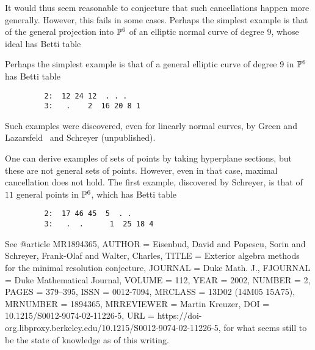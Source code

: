 It would thus seem reasonable to conjecture that such cancellations happen more generally. However, this fails in some cases. Perhaps the simplest example is that of the general projection into ${\mathbb P}^{6}$ of
an elliptic normal curve of degree 9, whose ideal has Betti table

Perhaps the simplest example is that of a general elliptic curve of degree 9 in ${\mathbb P}^{6}$
has Betti table
\begin{verbatim}
         2:  12 24 12  . . .
         3:   .    2  16 20 8 1
\end{verbatim}
Such examples were discovered, even for linearly normal curves, by Green and Lazarsfeld~\cite{ M. GREEN and R. LAZARSFELD, Some results on the syzygies of finite sets and algebraiccurves,CompositioMath.67(1988),301?314.MR90d:14034 381, 391, 392} and Schreyer (unpublished). 

One can derive examples of sets of points by taking hyperplane sections, but these are not general sets of points. However, even in that case, maximal cancellation does not hold. The first example, discovered by
Schreyer, is that of $11$ general points in ${\mathbb P}^{6}$, which has Betti table
 
\begin{verbatim}
         2:  17 46 45  5  . .
         3:   .  .      1  25 18 4
\end{verbatim}
 See 
@article {MR1894365,
    AUTHOR = {Eisenbud, David and Popescu, Sorin and Schreyer, Frank-Olaf
              and Walter, Charles},
     TITLE = {Exterior algebra methods for the minimal resolution
              conjecture},
   JOURNAL = {Duke Math. J.},
  FJOURNAL = {Duke Mathematical Journal},
    VOLUME = {112},
      YEAR = {2002},
    NUMBER = {2},
     PAGES = {379--395},
      ISSN = {0012-7094},
   MRCLASS = {13D02 (14M05 15A75)},
  MRNUMBER = {1894365},
MRREVIEWER = {Martin Kreuzer},
       DOI = {10.1215/S0012-9074-02-11226-5},
       URL = {https://doi-org.libproxy.berkeley.edu/10.1215/S0012-9074-02-11226-5},
}
for what seems still to be the state of knowledge as of this writing. 

